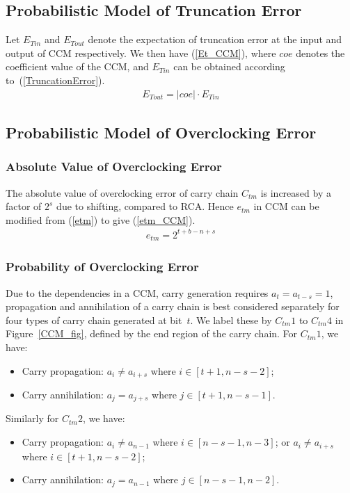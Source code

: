 \documentclass[journal]{IEEEtran}
\begin{document}
\subsection{Probabilistic Model of Truncation Error}
Let $E_{Tin}$ and $E_{Tout}$ denote the expectation of truncation error at the input and output of CCM respectively. We then have (\ref{Et_CCM}), where $coe$ denotes the coefficient value of the CCM, and $E_{Tin}$ can be obtained according to~(\ref{TruncationError}).
%
\begin{eqnarray}\label{Et_CCM}
  E_{Tout}=|coe|\cdot E_{Tin}
\end{eqnarray}

\subsection{Probabilistic Model of Overclocking Error}
\subsubsection{Absolute Value of Overclocking Error}
The absolute value of overclocking error of carry chain $C_{tm}$ is increased by a factor of $2^s$ due to shifting, compared to RCA. Hence $e_{tm}$ in CCM can be modified from (\ref{etm}) to give (\ref{etm_CCM}).
%
\begin{eqnarray}\label{etm_CCM}
  e_{tm}=2^{t+b-n+s}
\end{eqnarray}

\subsubsection{Probability of Overclocking Error}
Due to the dependencies in a CCM, carry generation requires $a_t=a_{t-s}=1$, propagation and annihilation of a carry chain is best considered separately for four types of carry chain generated at bit~$t$. We label these by $C_{tm}1$ to $C_{tm}4$ in Figure~\ref{CCM_fig}, defined by the end region of the carry chain. For $C_{tm}1$, we have:
\begin{itemize}
  \item Carry propagation: $\!a_i\neq\!a_{i+s}\!$ where $\!i\!\in[t+1,n-s-2]\!$;
  \item Carry annihilation: $\!a_j\!=\!a_{j+s}\!$ where $\!j\!\in[t+1,n-s-1]\!$.
\end{itemize}
Similarly for $C_{tm}2$, we have:
\begin{itemize}
  \item Carry propagation: $a_i\neq a_{n-1}$ where $i\in[n-s-1,n-3]$; or $a_i\neq a_{i+s}$ where $i\in[t+1,n-s-2]$;
  \item Carry annihilation: $\!a_j\!=a_{n-1}\!$ where $j\!\in\![n-s-1,n-2]$.
\end{itemize}
\end{document}
